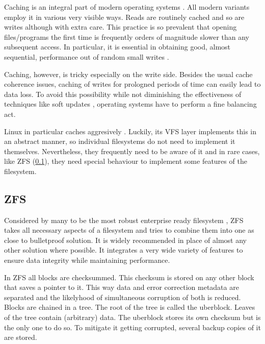             Caching is an integral part of modern operating systems
            \cite{IO_bottleneck?}. All modern variants employ it in various
            very visible ways. Reads are routinely cached and so are writes
            although with extra care. This practice is so prevalent that
            opening files/programs the first time is frequently orders of
            magnitude slower than any subsequent access. In particular, it is
            essential in obtaining good, almost sequential, performance out of
            random small writes \cite{soft_updates}.

            Caching, however, is tricky especially on the write side. Besides
            the usual cache coherence issues, caching of writes for prologned
            periods of time can easily lead to data loss. To avoid this
            possibility while not diminishing the effectiveness of techniques
            like soft updates \cite{soft_updates}, operating systems have to
            perform a fine balancing act.

            Linux in particular caches aggresively \cite{its docs?}. Luckily,
            its VFS layer implements this in an abstract manner, so individual
            filesystems do not need to implement it themselves. Nevertheless,
            they frequently need to be aware of it and in rare cases, like ZFS
            (\ref{sec_ZFS}), they need special behaviour to implement some
            features of the filesystem.

        \subsection{ZFS}
            \label{sec_ZFS}

            Considered by many to be the most robust enterprise ready
            filesystem \cite{pls you have to}, ZFS takes all necessary aspects
            of a filesystem and tries to combine them into one as close to
            bulletproof solution. It is widely recommended in place of almost
            any other solution where possible. It integrates a very wide
            variety of features to ensure data integrity while maintaining
            performance.

            In ZFS all blocks are checksummed. This checksum is stored on any
            other block that saves a pointer to it. This way data and error
            correction metadata are separated and the likelyhood of
            simultaneous corruption of both is reduced. Blocks are chained in a
            tree. The root of the tree is called the uberblock. Leaves of the
            tree contain (arbitrary) data. The uberblock stores its own
            checksum but is the only one to do so. To mitigate it getting
            corrupted, several backup copies of it are stored.

